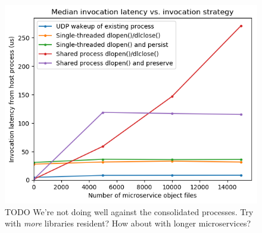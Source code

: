 \begin{figure}
\includegraphics[width=\columnwidth]{figs/2017-18-29-motivation_numfuns-median_no_forkexec}
\caption{TODO We're not doing well against the consolidated processes. Try with \textit{more} libraries resident? How about with longer microservices?}
\label{fig:motivezoom}
\end{figure}

